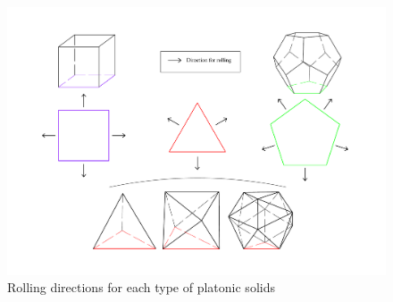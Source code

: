 \noindent  
% 
%
%
\begin{figure}[h]
\centering
	\includegraphics[width=1\textwidth]{image/rollingDir2.pdf}
	\caption{Rolling directions for each type of platonic solids}
	\label{fig:rollingDir}
\end{figure}
%
% 
%
%
%
%
\clearpage
\newpage
